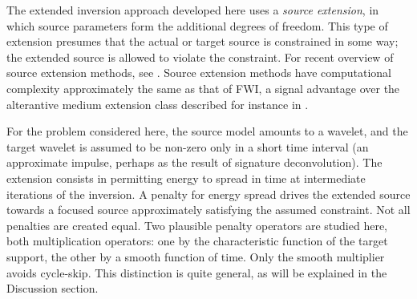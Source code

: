 The extended inversion approach
developed here uses a {\em source extension}, in which source
parameters form the additional degrees of freedom. This type of
extension presumes that the actual or target source is constrained in
some way; the extended source is allowed to violate the
constraint. For recent overview of source extension methods, see
\cite{HuangNammourSymesDollizal:SEG19}. Source
extension methods have computational complexity approximately the same
as that of FWI, a signal advantage over the alterantive medium
extension class described for instance in \cite[]{geoprosp:2008}.

For the problem considered here, the source model amounts to a
wavelet, and the target wavelet is assumed to be non-zero only in a
short time interval (an approximate impulse, perhaps as the result of
signature deconvolution). The extension consists in permitting energy
to spread in time at intermediate iterations of the inversion. A
penalty for energy spread drives the extended source towards a focused
source approximately satisfying the assumed constraint. Not all
penalties are created equal. Two plausible penalty operators are
studied here, both multiplication operators: one by the characteristic
function of the target support, the other by a smooth function of
time. Only the smooth multiplier avoids cycle-skip. This distinction
is quite general, as will be explained in the Discussion section.


